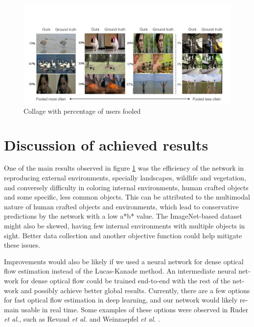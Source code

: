 \documentclass[12pt,openright,oneside,a4paper,english]{abntex2}
\begin{document}
\begin{otherlanguage}{english}
\begin{figure}[H]
\centering
\includegraphics[width=\textwidth+20pt]{fool_collage}
\caption{Collage with percentage of users fooled}
\label{fig:fool_collage}
\end{figure}

\chapter{Discussion of achieved results}
One of the main results observed in figure \ref{fig:fool_collage} was the efficiency of the network in reproducing external environments, specially landscapes, wildlife and vegetation, and conversely difficulty in coloring internal environments, human crafted objects and some specific, less common objects. This can be attributed to the multimodal nature of human crafted objects and environments, which lead to conservative predictions by the network with a low a*b* value.  The ImageNet-based dataset might also be skewed, having few internal environments with multiple objects in sight. Better data collection and another objective function could help mitigate these issues.

Improvements would also be likely if we used a neural network for dense optical flow estimation instead of the Lucas-Kanade method. An intermediate neural network for dense optical flow could be trained end-to-end with the rest of the network and possibly achieve better global results. Currently, there are a few options for fast optical flow estimation in deep learning, and our network would likely remain usable in real time. Some examples of these options were observed in Ruder \textit{et al.}\cite{Ruder2016}, such as Revaud \textit{et al.} \cite{epicflow} and Weinzaepfel \textit{et al.} \cite{deepflow}.





\end{otherlanguage}
\end{document}
